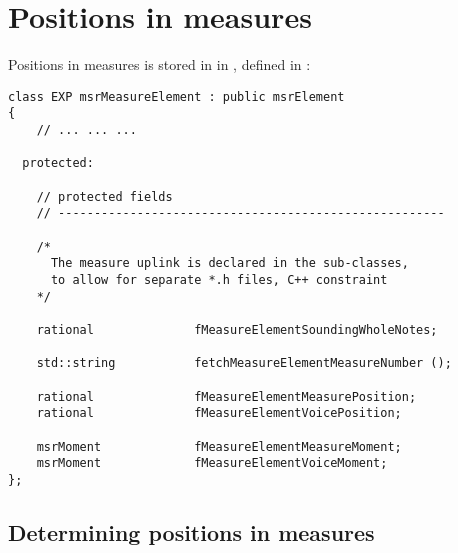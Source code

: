 

\chapter{Positions in measures}

Positions in measures is stored in  in , defined in :
\begin{lstlisting}[language=CPlusPlus]
class EXP msrMeasureElement : public msrElement
{
	// ... ... ...

  protected:

    // protected fields
    // ------------------------------------------------------

    /*
      The measure uplink is declared in the sub-classes,
      to allow for separate *.h files, C++ constraint
    */

    rational              fMeasureElementSoundingWholeNotes;

    std::string           fetchMeasureElementMeasureNumber ();

    rational              fMeasureElementMeasurePosition;
    rational              fMeasureElementVoicePosition;

    msrMoment             fMeasureElementMeasureMoment;
    msrMoment             fMeasureElementVoiceMoment;
};
\end{lstlisting}

\section{Determining positions in measures}

